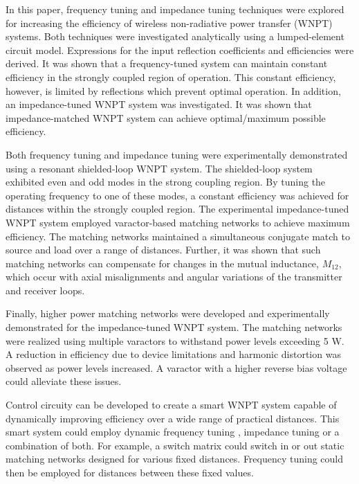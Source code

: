 \documentclass[journal]{IEEEtran}
\begin{document}
In this paper, frequency tuning and impedance tuning techniques were explored for increasing the efficiency of wireless non-radiative power transfer (WNPT) systems. Both techniques were investigated analytically using a lumped-element circuit model. Expressions for the input reflection coefficients and efficiencies were derived. It was shown that a frequency-tuned system can maintain constant efficiency in the strongly coupled region of operation. This constant efficiency, however, is limited by reflections which prevent optimal operation. In addition, an impedance-tuned WNPT system was investigated. It was shown that impedance-matched WNPT system can achieve optimal/maximum possible efficiency.

Both frequency tuning and impedance tuning were experimentally demonstrated using a resonant shielded-loop WNPT system. The shielded-loop system exhibited even and odd modes in the strong coupling region. By tuning the operating frequency to one of these modes, a constant efficiency was achieved for distances within the strongly coupled region.  The experimental impedance-tuned WNPT system employed varactor-based matching networks to achieve maximum efficiency. The matching networks maintained a simultaneous conjugate match to source and load over a range of distances. Further, it was shown that such matching networks can compensate for changes in the mutual inductance, $M_{12}$, which occur with axial misalignments and angular variations of the transmitter and receiver loops.

Finally, higher power matching networks were developed and experimentally demonstrated for the impedance-tuned WNPT system. The matching networks were realized using multiple varactors to withstand power levels exceeding 5 W. A reduction in efficiency due to device limitations and harmonic distortion was observed as power levels increased. A varactor with a higher reverse bias voltage could alleviate these issues.

Control circuity can be developed to create a smart WNPT system capable of dynamically improving efficiency over a wide range of practical distances. This smart system could employ dynamic frequency tuning \cite{Auto-Tune}, impedance tuning or a combination of both. For example, a switch matrix could switch in or out static matching networks designed for various fixed distances. Frequency tuning could then be employed for distances between these fixed values.


\end{document}
